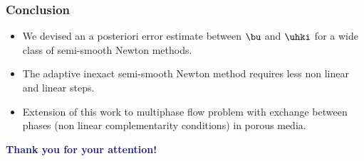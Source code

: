 \documentclass[10 pt]{beamer}
\begin{document}
\begin{frame}
\frametitle{Conclusion}
\begin{itemize}
\item
We devised an a posteriori error estimate between $\bu$ and $\uhki$ for a wide class of semi-smooth Newton methods.
\vspace{0.5 cm}
\item
The adaptive inexact semi-smooth Newton method requires less non linear and linear steps. 
\vspace{0.5 cm}
\item
Extension of this work to  multiphase flow problem with exchange between phases (non linear complementarity conditions) in porous media.  
\end{itemize}
\vspace{1 cm}
\Large
\hspace{1.8 cm}
\textcolor{midnightblue}
{\textbf{
Thank you for your attention!}}
\end{frame}
%
\end{document}
